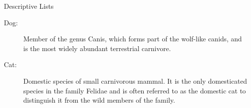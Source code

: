 \documentclass[a4paper, 12pt]{article}
\begin{document}
Descriptive Lists

\begin{description}
\item[Dog:] Member of the genus Canis, which forms part of the wolf-like canids,
    and is the most widely abundant terrestrial carnivore.
\item[Cat:] Domestic species of small carnivorous mammal. It is the only
  domesticated species in the family Felidae and is often referred to as the
  domestic cat to distinguish it from the wild members of the family.
\end{description}
\end{document}

